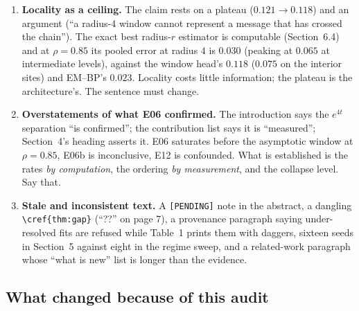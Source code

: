 \documentclass[11pt,a4paper]{article}
\newcommand{\hi}[1]{\textbf{#1}}
\theoremstyle{definition}
\theoremstyle{remark}
\begin{document}
\begin{enumerate}
\item \hi{Locality as a ceiling.} The claim rests on a plateau ($0.121\to0.118$) and an argument (``a radius-4 window cannot represent a message that has crossed the chain''). The exact best radius-$r$ estimator is computable (Section~6.4) and at $\rho=0.85$ its pooled error at radius $4$ is $0.030$ (peaking at $0.065$ at intermediate levels), against the window head's $0.118$ ($0.075$ on the interior sites) and EM--BP's $0.023$. Locality costs little information; the plateau is the architecture's. The sentence must change.
\item \hi{Overstatements of what E06 confirmed.} The introduction says the $e^{4t}$ separation ``is confirmed''; the contribution list says it is ``measured''; Section~4's heading asserts it. E06 saturates before the asymptotic window at $\rho=0.85$, E06b is inconclusive, E12 is confounded. What is established is the rates \emph{by computation}, the ordering \emph{by measurement}, and the collapse level. Say that.
\item \hi{Stale and inconsistent text.} A \texttt{[PENDING]} note in the abstract, a dangling \verb|\cref{thm:gap}| (``??'' on page 7), a provenance paragraph saying under-resolved fits are refused while Table~1 prints them with daggers, sixteen seeds in Section~5 against eight in the regime sweep, and a related-work paragraph whose ``what is new'' list is longer than the evidence.
\end{enumerate}

\subsection{What changed because of this audit}
\end{document}
